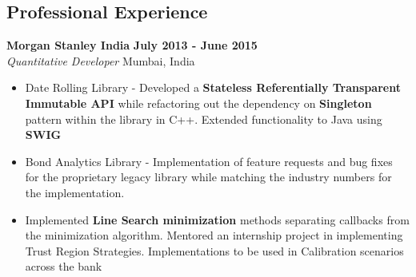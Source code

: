 \documentclass[margin,line]{resume}
\begin{document}
\begin{resume}
\section{\mysidestyle Professional Experience}
        \textbf{Morgan Stanley India} \hfill \textbf{July 2013 - June 2015} \\
        \emph{Quantitative Developer} \hfill Mumbai, India
        \begin{itemize}[leftmargin=*]
\item Date Rolling Library - Developed a \textbf{Stateless Referentially  Transparent Immutable API} while refactoring out the dependency on \textbf{Singleton} pattern within the library in C++. Extended functionality to Java using \textbf{SWIG}
\item Bond Analytics Library - Implementation of feature requests and bug fixes for the proprietary legacy library while matching the industry numbers for the implementation.
\item Implemented \textbf{Line Search minimization} methods separating callbacks from the minimization algorithm. Mentored an internship project in implementing Trust Region Strategies. Implementations to be used in Calibration scenarios across the bank
\end{itemize}




\end{resume}
\end{document}
